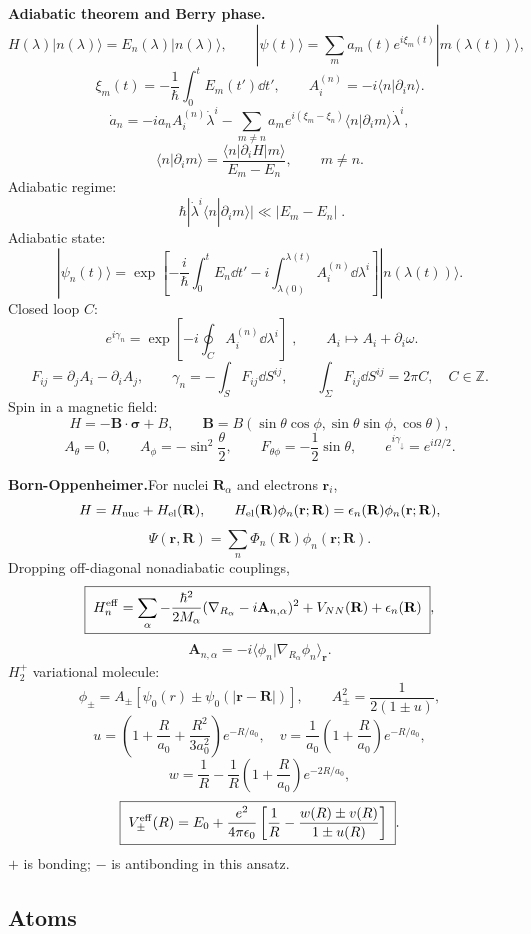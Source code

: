 \noindent\textbf{Adiabatic theorem and Berry phase.}\quad
\[
H(\lambda)|n(\lambda)\rangle=E_n(\lambda)|n(\lambda)\rangle,\qquad
|\psi(t)\rangle=\sum_m a_m(t)e^{i\xi_m(t)}|m(\lambda(t))\rangle,
\]
\[
\xi_m(t)=-\frac1{\hbar}\int_0^tE_m(t')\dd t',\qquad
A_i^{(n)}=-i\langle n|\partial_i n\rangle.
\]
\[
\dot a_n=-ia_nA_i^{(n)}\dot\lambda^i
-\sum_{m\ne n}a_m e^{i(\xi_m-\xi_n)}
\langle n|\partial_i m\rangle\dot\lambda^i,
\]
\[
\langle n|\partial_i m\rangle
=\frac{\langle n|\partial_iH|m\rangle}{E_m-E_n},\qquad m\ne n.
\]
Adiabatic regime:
\[
\boxed{\;\hbar|\dot\lambda^i\langle n|\partial_i m\rangle|
\ll |E_m-E_n|\;}.
\]
Adiabatic state:
\[
|\psi_n(t)\rangle=
\exp\left[-\frac{i}{\hbar}\int_0^tE_n\dd t'
-i\int_{\lambda(0)}^{\lambda(t)}A_i^{(n)}\dd\lambda^i\right]
|n(\lambda(t))\rangle.
\]
Closed loop $C$:
\[
\boxed{\;e^{i\gamma_n}=\exp\left[-i\oint_C A_i^{(n)}\dd\lambda^i\right]\;},
\qquad
A_i\mapsto A_i+\partial_i\omega.
\]
\[
F_{ij}=\partial_jA_i-\partial_iA_j,\qquad
\gamma_n=-\int_SF_{ij}\dd S^{ij},\qquad
\int_\Sigma F_{ij}\dd S^{ij}=2\pi C,\quad C\in\mathbb Z.
\]
Spin in a magnetic field:
\[
H=-\mathbf B\cdot\bm{\sigma}+B,\qquad
\mathbf B=B(\sin\theta\cos\phi,\sin\theta\sin\phi,\cos\theta),
\]
\[
A_\theta=0,\qquad A_\phi=-\sin^2\frac{\theta}{2},\qquad
F_{\theta\phi}=-\frac12\sin\theta,\qquad
e^{i\gamma_\downarrow}=e^{i\Omega/2}.
\]

\noindent\textbf{Born-Oppenheimer.}\quad For nuclei $\mathbf R_\alpha$ and
electrons $\mathbf r_i$,
\[
H=H_{\rm nuc}+H_{\rm el}(\mathbf R),\qquad
H_{\rm el}(\mathbf R)\phi_n(\mathbf r;\mathbf R)
=\epsilon_n(\mathbf R)\phi_n(\mathbf r;\mathbf R),
\]
\[
\Psi(\mathbf r,\mathbf R)=\sum_n\Phi_n(\mathbf R)\phi_n(\mathbf r;\mathbf R).
\]
Dropping off-diagonal nonadiabatic couplings,
\[
\boxed{\;H_n^{\rm eff}=
\sum_\alpha-\frac{\hbar^2}{2M_\alpha}
(\nabla_{R_\alpha}-i\mathbf A_{n,\alpha})^2
+V_{NN}(\mathbf R)+\epsilon_n(\mathbf R)\;},
\]
\[
\mathbf A_{n,\alpha}=-i\langle\phi_n|\nabla_{R_\alpha}\phi_n\rangle_{\mathbf r}.
\]
$H_2^+$ variational molecule:
\[
\phi_\pm=A_\pm[\psi_0(r)\pm\psi_0(|\mathbf r-\mathbf R|)],\qquad
A_\pm^2=\frac1{2(1\pm u)},
\]
\[
u=\left(1+\frac{R}{a_0}+\frac{R^2}{3a_0^2}\right)e^{-R/a_0},\quad
v=\frac1{a_0}\left(1+\frac{R}{a_0}\right)e^{-R/a_0},
\]
\[
w=\frac1R-\frac1R\left(1+\frac{R}{a_0}\right)e^{-2R/a_0},
\]
\[
\boxed{\;V_\pm^{\rm eff}(R)=E_0+\frac{e^2}{4\pi\epsilon_0}
\left[\frac1R-\frac{w(R)\pm v(R)}{1\pm u(R)}\right]\;}.
\]
$+$ is bonding; $-$ is antibonding in this ansatz.

\subsection{Atoms}

